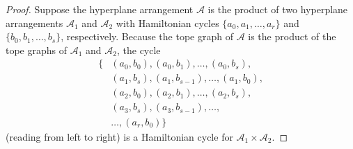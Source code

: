 \documentclass[10pt,a4paper]{amsart}
\newcommand{\A}{\mathcal{A}}
\newcommand{\mA}{{\mathcal A}}
\begin{document}
	\begin{proof}
		Suppose the hyperplane arrangement $\mA$ is the product of two hyperplane arrangements $\A_1$ and $\A_2$ with Hamiltonian cycles $\{a_0, a_1, \ldots , a_r \}$ and $\{b_0, b_1, \ldots , b_s \}$, respectively.
		Because the tope graph of $\mA$ is the product of the tope graphs of $\mA_1$ and $\mA_2$, the cycle
		\begin{align*}
			\{&(a_0, b_0), (a_0,b_1), \ldots,(a_0,b_s),\\
			&(a_1, b_s), (a_1,b_{s-1}), \ldots,(a_1,b_0),\\
			&(a_2, b_0), (a_2,b_1), \ldots,(a_2,b_s),\\
			&(a_3, b_s), (a_3,b_{s-1}), \ldots, \\
			&\ldots, (a_r,b_0)\}
		\end{align*}
		(reading from left to right) is a Hamiltonian cycle for $\A_1 \times \A_2$.
	\end{proof}
\end{document}
